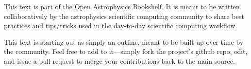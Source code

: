 This text is part of the Open Astrophysics Bookshelf.  It is meant to
be written collaboratively by the astrophysics scientific computing
community to share best practices and tips/tricks used in the day-to-day
scientific computing workflow.

This text is starting out as simply an outline, meant to be built up
over time by the community.  Feel free to add to it---simply fork the
project's github repo, edit, and issue a pull-request to merge your
contributions back to the main source.


